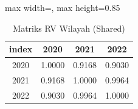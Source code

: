 \begin{table}[H]
\centering
\caption{Matriks RV Wilayah (Shared)} \makeatletter{}\makeatother
\begin{adjustbox}{max width=\textwidth, max height=0.85\textheight}
\begin{tabular}{|c|c|c|c|}
\hline
\textbf{index} & \textbf{2020} & \textbf{2021} & \textbf{2022} \\
\hline
2020 & 1.0000 & 0.9168 & 0.9030 \\
2021 & 0.9168 & 1.0000 & 0.9964 \\
2022 & 0.9030 & 0.9964 & 1.0000 \\
\hline
\end{tabular}
\end{adjustbox}
\end{table}